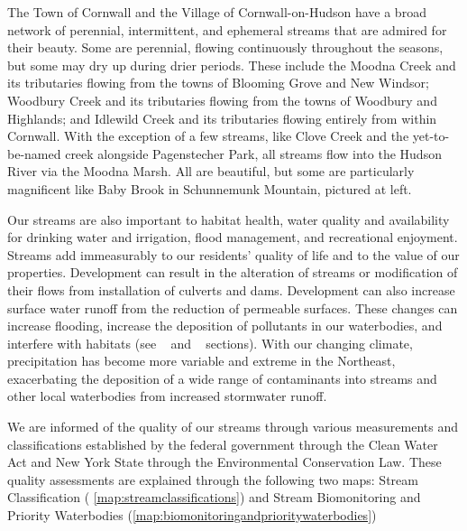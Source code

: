 The Town of Cornwall and the Village of Cornwall-on-Hudson have a broad network 
of perennial, intermittent, and ephemeral streams that are admired for their 
beauty. Some are perennial, flowing continuously throughout the seasons, but 
some may dry up during drier periods. These include the Moodna Creek and its 
tributaries flowing from the towns of Blooming Grove and New Windsor; Woodbury 
Creek and its tributaries flowing from the towns of Woodbury and Highlands; and 
Idlewild Creek and its tributaries flowing entirely from within Cornwall. With 
the exception of a few streams, like Clove Creek and the yet-to-be-named creek 
alongside Pagenstecher Park, all streams flow into the Hudson River via the 
Moodna Marsh. All are beautiful, but some are particularly magnificent like Baby 
Brook in Schunnemunk Mountain, pictured at left.

Our streams are also important to habitat health, water quality and 
availability for drinking water and irrigation, flood management, and 
recreational enjoyment. Streams add immeasurably to our residents’ quality of 
life and to the value of our properties. Development can result in the 
alteration of streams or modification of their flows from installation of 
culverts and dams. Development can also increase surface water runoff from the 
reduction of permeable surfaces. These changes can increase flooding, increase 
the deposition of pollutants in our waterbodies, and interfere with habitats 
(see ~ and 
~ sections). With our changing climate, 
precipitation has become more variable and extreme in the Northeast, 
exacerbating the deposition of a wide range of contaminants into streams and 
other local waterbodies from increased stormwater runoff.

We are informed of the quality of our streams through various measurements and 
classifications established by the federal government through the Clean Water 
Act and New York State through the Environmental Conservation Law. These 
quality assessments are explained through the following two maps: Stream 
Classification ( \ref{map:streamclassifications}) and Stream Biomonitoring and 
Priority Waterbodies (\ref{map:biomonitoringandprioritywaterbodies})

